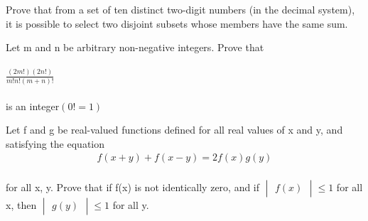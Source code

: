 \item Prove that from a set of ten distinct two-digit numbers (in the decimal system), it is possible to select two disjoint subsets whose members have the same sum.\\
\item Let m and n be arbitrary non-negative integers. Prove that\\
\\ $\frac{(2m!)(2n!)}{m!n!(m+n)!}$\\
\\ is an integer$(0! = 1)$\\
\item Let f and g be real-valued functions defined for all real values of x and y, and satisfying the equation
\begin{align}
f(x + y) + f(x - y) = 2f(x)g(y)
\end{align}
\\for all x, y. Prove that if f(x) is not identically zero, and if $\begin{vmatrix} f(x) \end{vmatrix} \leq 1$ for all x, then $\begin{vmatrix} g(y) \end{vmatrix} \leq 1$ for all y.


